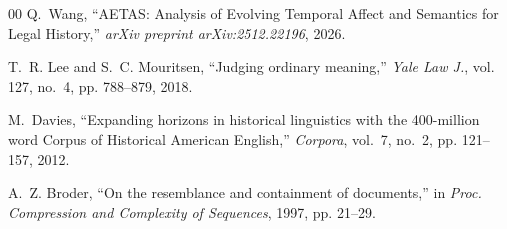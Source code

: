 \documentclass[conference]{IEEEtran}
\begin{document}
\begin{thebibliography}{00}
Q.~Wang, ``AETAS: Analysis of Evolving Temporal Affect and Semantics for Legal History,'' \emph{arXiv preprint arXiv:2512.22196}, 2026.

T.~R. Lee and S.~C. Mouritsen, ``Judging ordinary meaning,'' \emph{Yale Law J.}, vol. 127, no.~4, pp. 788--879, 2018.

M.~Davies, ``Expanding horizons in historical linguistics with the 400-million word Corpus of Historical American English,'' \emph{Corpora}, vol.~7, no.~2, pp. 121--157, 2012.

A.~Z. Broder, ``On the resemblance and containment of documents,'' in \emph{Proc. Compression and Complexity of Sequences}, 1997, pp. 21--29.

\end{thebibliography}
\end{document}
